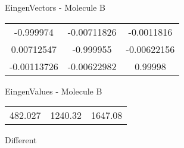 \begin{multicols}{2}
\begin{center}
\vtab
 EingenVectors - Molecule B     \\
\vtab
\begin{tabular}{|c c c|}
-0.999974	 & 	-0.00711826	 & 	-0.0011816	 \\
0.00712547	 & 	-0.999955	 & 	-0.00622156	 \\
-0.00113726	 & 	-0.00622982	 & 	0.99998
\end{tabular}

\vtab
 EingenValues - Molecule B     \\
\vtab
\begin{tabular}{|c c c|}
482.027	 & 	1240.32	 & 	1647.08	 \\
\end{tabular}

\end{center}
\end{multicols}
\begin{center}
\vtab
\vtab
\textcolor{NavyBlue}{\Large Different}
\end{center}

 \newpage

